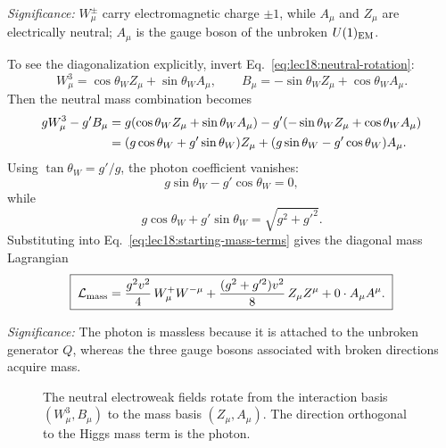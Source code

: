 \textit{Significance:} $W^\pm_\mu$ carry electromagnetic charge $\pm1$, while $A_\mu$ and $Z_\mu$ are electrically neutral; $A_\mu$ is the gauge boson of the unbroken $U(1)_{\rm EM}$.

To see the diagonalization explicitly, invert Eq.~\eqref{eq:lec18:neutral-rotation}:
\begin{equation}
  W^3_\mu=\cos\theta_W Z_\mu+\sin\theta_W A_\mu,
  \qquad
  B_\mu=-\sin\theta_W Z_\mu+\cos\theta_W A_\mu .
  \label{eq:lec18:neutral-inverse}
\end{equation}
Then the neutral mass combination becomes
\begin{align}
  gW^3_\mu-g'B_\mu
  &=g(\cos\theta_W Z_\mu+\sin\theta_W A_\mu)
    -g'(-\sin\theta_W Z_\mu+\cos\theta_W A_\mu) \notag\\
  &=(g\cos\theta_W+g'\sin\theta_W)Z_\mu
    +(g\sin\theta_W-g'\cos\theta_W)A_\mu .
  \label{eq:lec18:neutral-combination-expanded}
\end{align}
Using $\tan\theta_W=g'/g$, the photon coefficient vanishes:
\begin{equation}
  g\sin\theta_W-g'\cos\theta_W=0,
  \label{eq:lec18:photon-coefficient-vanishes}
\end{equation}
while
\begin{equation}
  g\cos\theta_W+g'\sin\theta_W=\sqrt{g^2+g'^2} .
  \label{eq:lec18:z-coefficient}
\end{equation}
Substituting into Eq.~\eqref{eq:lec18:starting-mass-terms} gives the diagonal
mass Lagrangian
\begin{equation}
  \boxed{\;
  \mathcal{L}_{\rm mass}
  =\frac{g^2v^2}{4}\,W^+_\mu W^{-\mu}
   +\frac{(g^2+g'^2)v^2}{8}\,Z_\mu Z^\mu
   +0\cdot A_\mu A^\mu .\;}
  \label{eq:lec18:diagonal-mass-lagrangian}
\end{equation}

\textit{Significance:} The photon is massless because it is attached to the unbroken generator $Q$, whereas the three gauge bosons associated with broken directions acquire mass.

\begin{figure}[ht]
\centering
{}
\caption{The neutral electroweak fields rotate from the interaction basis $(W^3_\mu,B_\mu)$ to the mass basis $(Z_\mu,A_\mu)$. The direction orthogonal to the Higgs mass term is the photon.}
\label{fig:lec18:weak-mixing}
\end{figure}

